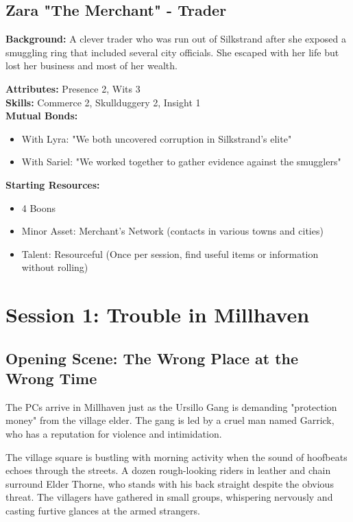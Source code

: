 \documentclass[11pt]{article}
\newenvironment{characterbox}[1]{%
  \begin{mdframed}[backgroundcolor=shadecolor, linewidth=1pt, linecolor=headercolor]%
  \subsection*{#1}%
}{%
  \end{mdframed}%
}
\begin{document}
\begin{characterbox}{Zara "The Merchant" - Trader}
\textbf{Background:} A clever trader who was run out of Silkstrand after she exposed a smuggling ring that included several city officials. She escaped with her life but lost her business and most of her wealth.

\textbf{Attributes:} Presence 2, Wits 3 \\
\textbf{Skills:} Commerce 2, Skullduggery 2, Insight 1 \\
\textbf{Mutual Bonds:}
\begin{itemize}
\item With Lyra: "We both uncovered corruption in Silkstrand's elite"
\item With Sariel: "We worked together to gather evidence against the smugglers"
\end{itemize}

\textbf{Starting Resources:}
\begin{itemize}
\item 4 Boons
\item Minor Asset: Merchant's Network (contacts in various towns and cities)
\item Talent: Resourceful (Once per session, find useful items or information without rolling)
\end{itemize}
\end{characterbox}

\section{Session 1: Trouble in Millhaven}

\subsection{Opening Scene: The Wrong Place at the Wrong Time}

The PCs arrive in Millhaven just as the Ursillo Gang is demanding "protection money" from the village elder. The gang is led by a cruel man named Garrick, who has a reputation for violence and intimidation.

The village square is bustling with morning activity when the sound of hoofbeats echoes through the streets. A dozen rough-looking riders in leather and chain surround Elder Thorne, who stands with his back straight despite the obvious threat. The villagers have gathered in small groups, whispering nervously and casting furtive glances at the armed strangers.
\end{document}
